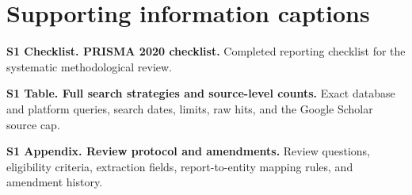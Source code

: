 \documentclass[
  english,
  letterpaper,
  DIV=11,
  numbers=noendperiod]{scrartcl}
\begin{document}
\section{Supporting information
captions}\label{supporting-information-captions}

\textbf{S1 Checklist. PRISMA 2020 checklist.} Completed reporting
checklist for the systematic methodological review.

\textbf{S1 Table. Full search strategies and source-level counts.} Exact
database and platform queries, search dates, limits, raw hits, and the
Google Scholar source cap.

\textbf{S1 Appendix. Review protocol and amendments.} Review questions,
eligibility criteria, extraction fields, report-to-entity mapping rules,
and amendment history.
\end{document}
